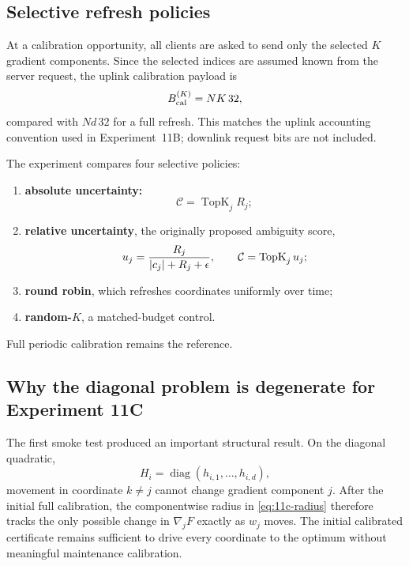 \subsection{Selective refresh policies}

At a calibration opportunity, all clients are asked to send only the selected $K$ gradient components. Since the selected indices are assumed known from the server request, the uplink calibration payload is
\begin{equation}
  B_{\rm cal}^{(K)}=N K\,32,
\end{equation}
compared with $Nd\,32$ for a full refresh. This matches the uplink accounting convention used in Experiment~11B; downlink request bits are not included.

The experiment compares four selective policies:
\begin{enumerate}
  \item \textbf{absolute uncertainty:}
  \begin{equation}
    \mathcal C=\operatorname{TopK}_j R_j;
  \end{equation}
  \item \textbf{relative uncertainty}, the originally proposed ambiguity score,
  \begin{equation}
    u_j=\frac{R_j}{\left|c_j\right|+R_j+\epsilon},
    \qquad
    \mathcal C=\operatorname{TopK}_j u_j;
  \end{equation}
  \item \textbf{round robin}, which refreshes coordinates uniformly over time;
  \item \textbf{random-$K$}, a matched-budget control.
\end{enumerate}
Full periodic calibration remains the reference.

\subsection{Why the diagonal problem is degenerate for Experiment 11C}

The first smoke test produced an important structural result. On the diagonal quadratic,
\begin{equation}
  H_i=\operatorname{diag}(h_{i,1},\ldots,h_{i,d}),
\end{equation}
movement in coordinate $k\neq j$ cannot change gradient component $j$. After the initial full calibration, the componentwise radius in \cref{eq:11c-radius} therefore tracks the only possible change in $\nabla_jF$ exactly as $w_j$ moves. The initial calibrated certificate remains sufficient to drive every coordinate to the optimum without meaningful maintenance calibration.

